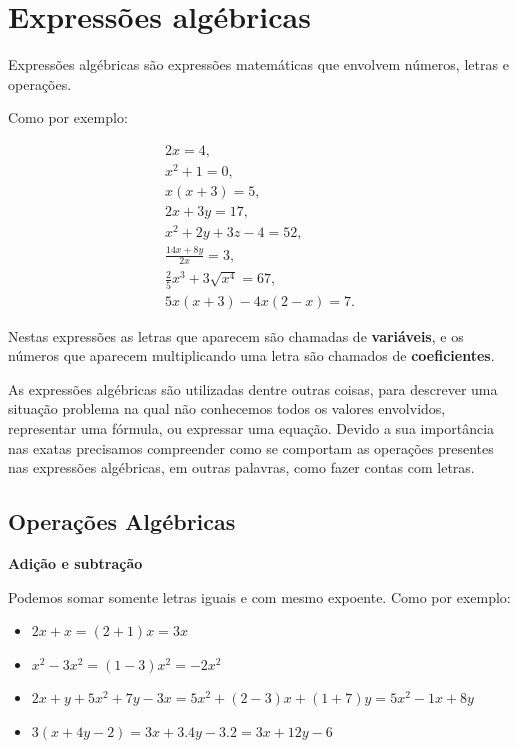 \chapter{Expressões algébricas}%

   \vskip0.3cm
 \colorbox{azul}{
 \begin{minipage}{0.9\linewidth}
 \begin{center}
  Expressões algébricas são expressões matemáticas que envolvem números, letras e operações.
 \end{center}
 \end{minipage}}
 \vskip0.3cm

 Como por exemplo:

 \begin{eqnarray*}
  2x=4,\\
  x^2+1=0,\\
  x(x+3)=5,\\
  2x+3y=17,\\
  x^2 + 2y + 3z -4= 52, \\
  \frac{14x + 8y}{2x}= 3, \\
  \frac{2}{5}x^3 + 3\sqrt{x^4}= 67, \\
  5x(x+3)-4x(2-x)=7.
 \end{eqnarray*}

 Nestas expressões as letras que aparecem são chamadas de \textbf{variáveis}, e os números que aparecem multiplicando uma letra são chamados de \textbf{coeficientes}.

 As expressões algébricas são utilizadas dentre outras coisas, para descrever uma situação problema na qual não conhecemos todos os valores envolvidos, representar uma fórmula, ou expressar uma equação. Devido a sua importância nas exatas precisamos compreender como se comportam as operações presentes nas expressões algébricas, em outras palavras, como fazer contas com letras.

\section{Operações Algébricas}

 \vskip0.3cm

 \textbf{Adição e subtração}

 Podemos somar somente letras iguais e com mesmo expoente. Como por exemplo:

 \begin{itemize}
  \item $2x + x= (2+1)x= 3x$
  \item $x^2 - 3x^2= (1-3)x^2= -2x^2$
  \item $2x + y + 5x^2 + 7y - 3x= 5x^2 + (2-3)x + (1+7)y= 5x^2 - 1x + 8y$
  \item $3(x+ 4y-2)= 3x + 3.4y - 3.2= 3x + 12y - 6$
 \end{itemize}

